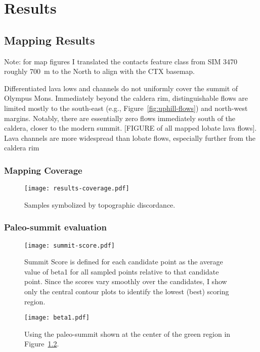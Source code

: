 \chapter{Results}

\section{Mapping Results}

Note: for map figures I translated the contacts feature class from SIM 3470 roughly \qty{700}{\m} to the North to align with the \ac{CTX} basemap.

Differentiated lava lows and channels do not uniformly cover the summit of Olympus Mons. Immediately beyond the caldera rim, distinguishable flows are limited mostly to the south-east (e.g., Figure~\ref{fig:uphill-flows}) and north-west margins. Notably, there are essentially zero flows immediately south of the caldera, closer to the modern summit. [FIGURE of all mapped lobate lava flows]. Lava channels are more widespread than lobate flows, especially further from the caldera rim 

\subsection{Mapping Coverage}


\begin{figure}
    \texttt{[image: results-coverage.pdf]}%
    \caption[Mapped topographic discordance]{Samples symbolized by topographic discordance.}%
    \label{fig:results-coverage}
\end{figure}

\subsection{Paleo-summit evaluation}
\begin{figure}
    \texttt{[image: summit-score.pdf]}%
    \caption[Paleo-summit evaluation]{Summit Score is defined for each candidate point as the average value of \acs{beta1} for all sampled points relative to that candidate point. Since the scores vary smoothly over the candidates, I show only the central contour plots to identify the lowest (best) scoring region.}%
    \label{fig:summit-score}
\end{figure}


\begin{figure}
    \texttt{[image: beta1.pdf]}%
    \caption[Distribution of \acs{beta1} for one paleo-summit candidate]{Using the paleo-summit shown at the center of the green region in Figure~\ref{fig:summit-score}.}%
    \label{fig:beta1}
\end{figure}

